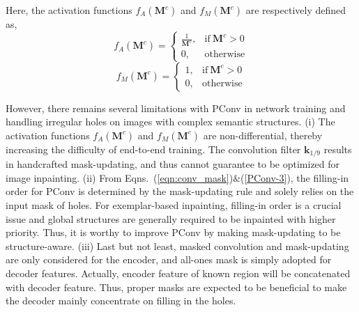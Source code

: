\documentclass[10pt,journal,compsoc]{IEEEtran}
\begin{document}
%
Here, the activation functions $f_A(\mathbf{M}^c)$ and $f_M(\mathbf{M}^c)$ are respectively defined as,
%
\begin{equation}\label{Activation_A}
	f_A(\mathbf{M}^c) =
	\begin{cases}
		\frac{1}{\mathbf{M}^c}, & \mbox{if} \ \mathbf{M}^c > 0 \\
		0, & \mbox{otherwise}
	\end{cases}
\end{equation}
%
\begin{equation}\label{Activation_M}
	f_M(\mathbf{M}^c) =
	\begin{cases}
		1, & \mbox{if} \ \mathbf{M}^c > 0 \\
		0, & \mbox{otherwise}
	\end{cases}
\end{equation}


However, there remains several limitations with PConv in network training and handling irregular holes on images with complex semantic structures.
%
(i) The activation functions $f_A(\mathbf{M}^c)$ and $f_M(\mathbf{M}^c)$ are non-differential, thereby increasing the difficulty of end-to-end training.
%
The convolution filter {$\mathbf{k}_{{1}/{9}}$} results in handcrafted mask-updating, and thus cannot guarantee to be optimized for image inpainting.
%
(ii) From Eqns.~(\ref{eqn:conv_mask})$\&$(\ref{PConv-3}), the filling-in order for PConv is determined by the mask-updating rule and solely relies on the input mask of holes.
%
For exemplar-based inpainting, filling-in order is a crucial issue and global structures are generally required to be inpainted with higher priority.
%
Thus, it is worthy to improve PConv by making mask-updating to be structure-aware.
%
(iii) Last but not least, masked convolution and mask-updating are only considered for the encoder, and all-ones mask is simply adopted for decoder features.
%
Actually, encoder feature of known region will be concatenated with decoder feature.
%
Thus, proper masks are expected to be beneficial to make the decoder mainly concentrate on filling in the holes.



%
\end{document}

